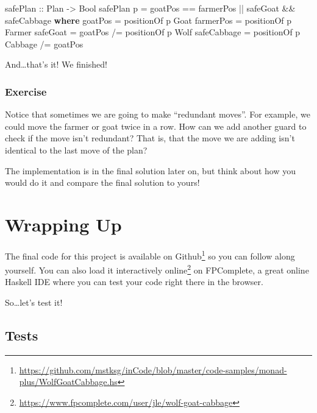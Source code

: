 \documentclass[]{article}
\newenvironment{Shaded}{}{}
\newcommand{\KeywordTok}[1]{\textcolor[rgb]{0.00,0.44,0.13}{\textbf{{#1}}}}
\newcommand{\DataTypeTok}[1]{\textcolor[rgb]{0.56,0.13,0.00}{{#1}}}
\newcommand{\OtherTok}[1]{\textcolor[rgb]{0.00,0.44,0.13}{{#1}}}
\newcommand{\FunctionTok}[1]{\textcolor[rgb]{0.02,0.16,0.49}{{#1}}}
\newcommand{\NormalTok}[1]{{#1}}
\renewcommand{\href}[2]{#2\footnote{\url{#1}}}
\begin{document}
\begin{Shaded}
\begin{Highlighting}[]
\OtherTok{safePlan ::} \DataTypeTok{Plan} \OtherTok{->} \DataTypeTok{Bool}
\NormalTok{safePlan p }\FunctionTok{=} \NormalTok{goatPos }\FunctionTok{==} \NormalTok{farmerPos }\FunctionTok{||} \NormalTok{safeGoat }\FunctionTok{&&} \NormalTok{safeCabbage}
    \KeywordTok{where}
        \NormalTok{goatPos     }\FunctionTok{=} \NormalTok{positionOf p }\DataTypeTok{Goat}
        \NormalTok{farmerPos   }\FunctionTok{=} \NormalTok{positionOf p }\DataTypeTok{Farmer}
        \NormalTok{safeGoat    }\FunctionTok{=} \NormalTok{goatPos }\FunctionTok{/=} \NormalTok{positionOf p }\DataTypeTok{Wolf}
        \NormalTok{safeCabbage }\FunctionTok{=} \NormalTok{positionOf p }\DataTypeTok{Cabbage} \FunctionTok{/=} \NormalTok{goatPos}
\end{Highlighting}
\end{Shaded}

And\ldots{}that's it! We finished!

\subsubsection{Exercise}\label{exercise}

Notice that sometimes we are going to make ``redundant moves''. For
example, we could move the farmer or goat twice in a row. How can we add
another guard to check if the move isn't redundant? That is, that the
move we are adding isn't identical to the last move of the plan?

The implementation is in the final solution later on, but think about
how you would do it and compare the final solution to yours!

\section{Wrapping Up}\label{wrapping-up}

The final code for this project is available
\href{https://github.com/mstksg/inCode/blob/master/code-samples/monad-plus/WolfGoatCabbage.hs}{on
Github} so you can follow along yourself. You can also
\href{https://www.fpcomplete.com/user/jle/wolf-goat-cabbage}{load it
interactively online} on FPComplete, a great online Haskell IDE where
you can test your code right there in the browser.

So\ldots{}let's test it!

\subsection{Tests}\label{tests}
\end{document}
